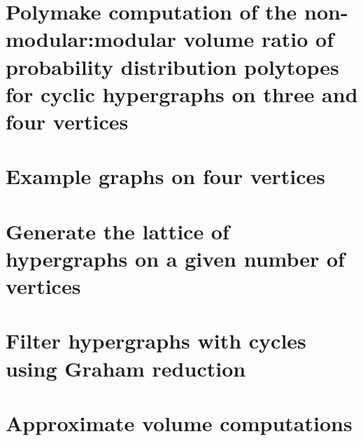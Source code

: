 \FloatBarrier

\section{Polymake computation of the non-modular:modular volume ratio of probability distribution polytopes for cyclic hypergraphs on three and four vertices}

\pagebreak

\section{Example graphs on four vertices}

\pagebreak

\section{Generate the lattice of hypergraphs on a given number of vertices}

\pagebreak

\section{Filter hypergraphs with cycles using Graham reduction}

\pagebreak

\section{Approximate volume computations}


\pagebreak
\tableofcontents
\listoffigures
\listoftables


